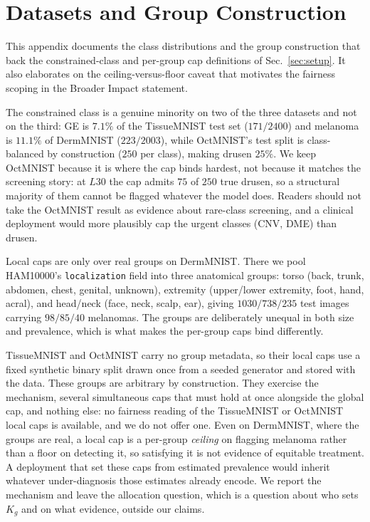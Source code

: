 \documentclass[10pt]{article}
\begin{document}
\section{Datasets and Group Construction}
\label{app:groups}

This appendix documents the class distributions and the group
construction that back the constrained-class and per-group cap
definitions of Sec.~\ref{sec:setup}. It also elaborates on the
ceiling-versus-floor caveat that motivates the fairness scoping in the
Broader Impact statement.

The constrained class is a genuine minority on two of the three
datasets and not on the third: GE is $7.1\%$ of the TissueMNIST test
set ($171/2400$) and melanoma is $11.1\%$ of DermMNIST ($223/2003$),
while OctMNIST's test split is class-balanced by construction ($250$
per class), making drusen $25\%$. We keep OctMNIST because it is where
the cap binds hardest, not because it matches the screening story: at
$L30$ the cap admits $75$ of $250$ true drusen, so a structural
majority of them cannot be flagged whatever the model does. Readers
should not take the OctMNIST result as evidence about rare-class
screening, and a clinical deployment would more plausibly cap the
urgent classes (CNV, DME) than drusen.

Local caps are only over real groups on DermMNIST. There we pool
HAM10000's \texttt{localization} field into three anatomical groups:
torso (back, trunk, abdomen, chest, genital, unknown), extremity
(upper/lower extremity, foot, hand, acral), and head/neck (face, neck,
scalp, ear), giving $1030/738/235$ test images carrying $98/85/40$
melanomas. The groups are deliberately unequal in both size and
prevalence, which is what makes the per-group caps bind differently.

TissueMNIST and OctMNIST carry no group metadata, so their local caps
use a fixed synthetic binary split drawn once from a seeded generator
and stored with the data. These groups are arbitrary by construction.
They exercise the mechanism, several simultaneous caps that must hold
at once alongside the global cap, and nothing else: no fairness
reading of the TissueMNIST or OctMNIST local caps is available, and we
do not offer one. Even on DermMNIST, where the groups are real, a
local cap is a per-group \emph{ceiling} on flagging melanoma rather
than a floor on detecting it, so satisfying it is not evidence of
equitable treatment. A deployment that set these caps from estimated
prevalence would inherit whatever under-diagnosis those estimates
already encode. We report the mechanism and leave the allocation
question, which is a question about who sets $K_g$ and on what
evidence, outside our claims.
\end{document}
